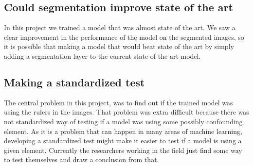 \subsection{Could segmentation improve state of the art}
In this project we trained a model that was almost state of the art.
We saw a clear improvement in the performance of the model on the segmented images,
so it is possible that making a model that would beat state of the art by simply adding a 
segmentation layer to the current state of the art model.

\subsection{Making a standardized test}
The central problem in this project, was to find out if the trained model was using the rulers in the images.
That problem was extra difficult because there was not standardized way of testing if a model was using some possibly confounding element.
As it is a problem that can happen in many areas of machine learning,
developing a standardized test might make it easier to test if a model is using a given element.
Currently the researchers working in the field just find some way to test themselves and draw a conclusion from that.